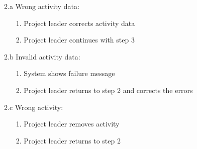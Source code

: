 \documentclass[a4paper,12pt]{article}
\begin{document}
\begin{usecase}
{	\item[2.a] Wrong activity data:
		\begin{enumerate}
		\item[1.] Project leader corrects activity data
		\item[2.] Project leader continues with step 3
		\end{enumerate}
	\item[2.b] Invalid activity data:
		\begin{enumerate}
		\item[1.] System shows failure message
		\item[2.] Project leader returns to step 2 and corrects the errors
		\end{enumerate}
	\item[2.c] Wrong activity:
		\begin{enumerate}
		\item[1.] Project leader removes activity
		\item[2.] Project leader returns to step 2
		\end{enumerate}	
}
\end{usecase}
\newpage
\end{document}
